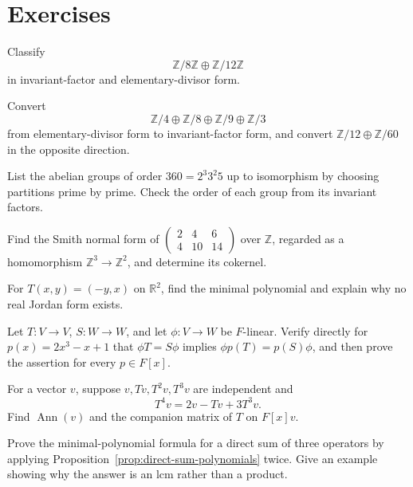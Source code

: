 \section*{Exercises}
\begin{exercise}[Basic] Classify
\[
\mathbb Z/8\mathbb Z\oplus\mathbb Z/12\mathbb Z
\]
in invariant-factor and elementary-divisor form.
\end{exercise}
\begin{exercise}[Core] Convert
\[
\mathbb Z/4\oplus\mathbb Z/8\oplus\mathbb Z/9\oplus\mathbb Z/3
\]
from elementary-divisor form to invariant-factor form, and convert
\(\mathbb Z/12\oplus\mathbb Z/60\) in the opposite direction.
\end{exercise}
\begin{exercise}[Core] List the abelian groups of order \(360=2^3 3^2 5\)
up to isomorphism by choosing partitions prime by prime.  Check the order of
each group from its invariant factors.\end{exercise}
\begin{exercise}[Core] Find the Smith normal form of
\(\begin{pmatrix}2&4&6\\4&10&14\end{pmatrix}\) over \(\mathbb Z\), regarded
as a homomorphism \(\mathbb Z^3\to\mathbb Z^2\), and determine its
cokernel.\end{exercise}
\begin{exercise}[Core] For \(T(x,y)=(-y,x)\) on \(\mathbb R^2\), find the
minimal polynomial and explain why no real Jordan form exists.\end{exercise}
\begin{exercise}[Core] Let \(T:V\to V\), \(S:W\to W\), and let
\(\phi:V\to W\) be \(F\)-linear.  Verify directly for
\(p(x)=2x^3-x+1\) that \(\phi T=S\phi\) implies
\(\phi p(T)=p(S)\phi\), and then prove the assertion for every
\(p\in F[x]\).\end{exercise}
\begin{exercise}[Core] For a vector \(v\), suppose
\(v,Tv,T^2v,T^3v\) are independent and
\[
T^4v=2v-Tv+3T^3v.
\]
Find \(\operatorname{Ann}(v)\) and the companion matrix of \(T\) on
\(F[x]v\).\end{exercise}
\begin{exercise}[Core] Prove the minimal-polynomial formula for a direct sum
of three operators by applying Proposition~\ref{prop:direct-sum-polynomials}
twice.  Give an example showing why the answer is an lcm rather than a
product.\end{exercise}
